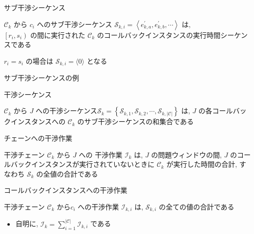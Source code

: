 \begin{frame}{サブ干渉シーケンス}
    \begin{definition}[サブ干渉シーケンス]
        $\mathcal{C}_{k}$ から $c_{i}$ へのサブ干渉シーケンス $\mathcal{S}_{k, i}=\left\langle e_{k, a}^{\prime}, e_{k, b}^{\prime}, \cdots\right\rangle$ は, \\$\left[r_{i}, s_{i}\right)$ の間に実行された $\mathcal{C}_{k}$ のコールバックインスタンスの実行時間シーケンスである
            \notes{\db{$e_{k, a}^{\prime}$}: コールバックインスタンス $c_{k, a}$ が $\left[r_{i}, s_{i}\right)$ の間に実行された時間の長さ}
    \end{definition}
    \vspace{5mm}
    $r_{i}=s_{i}$ の場合は $\mathcal{S}_{k, i}=\langle 0\rangle$ となる
\end{frame}

\begin{frame}{サブ干渉シーケンスの例}
\end{frame}

\begin{frame}{干渉シーケンス}
    \begin{definition}[干渉シーケンス]
        $\mathcal{C}_{k}$ から $J$ への干渉シーケンス$\mathcal{S}_{k}=\left\{\mathcal{S}_{k, 1}, \mathcal{S}_{k, 2}, \cdots, \mathcal{S}_{k,|\mathcal{C}|}\right\}$ は, $J$ の各コールバックインスタンスへの $\mathcal{C}_{k}$ のサブ干渉シーケンスの和集合である
    \end{definition}
\end{frame}

\begin{frame}{チェーンへの干渉作業}
    \begin{definition}[チェーンへの干渉作業]
        干渉チェーン $\mathcal{C}_{k}$ から $J$ への 干渉作業 $\mathcal{I}_{k}$ は, $J$ の問題ウィンドウの間, $J$ のコールバックインスタンスが実行されていないときに $\mathcal{C}_{k}$ が実行した時間の合計, すなわち $\mathcal{S}_{k}$ の全値の合計である
    \end{definition}
\end{frame}

\begin{frame}{コールバックインスタンスへの干渉作業}
    \begin{definition}[コールバックインスタンスへの干渉作業]
        干渉チェーン $\mathcal{C}_{k}$ から$c_{i}$ への干渉作業 $\mathcal{I}_{k, i}$ は, $\mathcal{S}_{k, i}$ の全ての値の合計である
    \end{definition}
    \begin{itemize}
        \item 自明に, $\mathcal{I}_{k}=\sum_{i=1}^{|\mathcal{C}|} \mathcal{I}_{k, i}$ である
    \end{itemize}
\end{frame}

